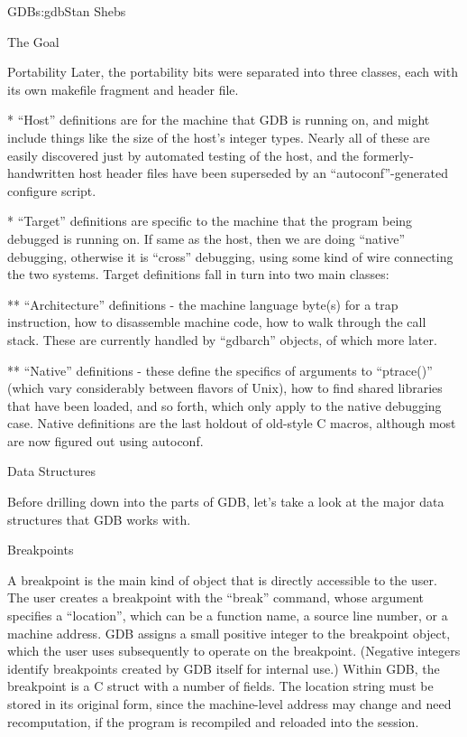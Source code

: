 \begin{aosachapter}{GDB}{s:gdb}{Stan Shebs}
\begin{aosasect1}{The Goal}
\begin{aosasect1}{Portability}
Later, the portability bits were separated into three classes, each
with its own makefile fragment and header file.

* ``Host'' definitions are for the machine that GDB is running on, and
might include things like the size of the host's integer types.
Nearly all of these are easily discovered just by automated testing of
the host, and the formerly-handwritten host header files have been
superseded by an ``autoconf''-generated configure script.

* ``Target'' definitions are specific to the machine that the program
being debugged is running on.  If same as the host, then we are doing
``native'' debugging, otherwise it is ``cross'' debugging, using some
kind of wire connecting the two systems.  Target definitions fall in
turn into two main classes:

** ``Architecture'' definitions - the machine language byte(s) for a
trap instruction, how to disassemble machine code, how to walk
through the call stack.  These are currently handled by ``gdbarch''
objects, of which more later.

** ``Native'' definitions - these define the specifics of arguments to
``ptrace()'' (which vary considerably between flavors of Unix), how to
find shared libraries that have been loaded, and so forth, which only
apply to the native debugging case.  Native definitions are the last
holdout of old-style C macros, although most are now figured out using
autoconf.

\end{aosasect1}

\begin{aosasect1}{Data Structures}

Before drilling down into the parts of GDB, let's take a look at the major
data structures that GDB works with.

\end{aosasect1}

\begin{aosasect1}{Breakpoints}

A breakpoint is the main kind of object that is directly accessible to
the user.  The user creates a breakpoint with the ``break'' command,
whose argument specifies a ``location'', which can be a function name,
a source line number, or a machine address.  GDB assigns a small
positive integer to the breakpoint object, which the user uses
subsequently to operate on the breakpoint.  (Negative integers
identify breakpoints created by GDB itself for internal use.)  Within
GDB, the breakpoint is a C struct with a number of fields.  The
location string must be stored in its original form, since the
machine-level address may change and need recomputation, if the
program is recompiled and reloaded into the session.


\end{aosasect1}
\end{aosasect1}
\end{aosachapter}
